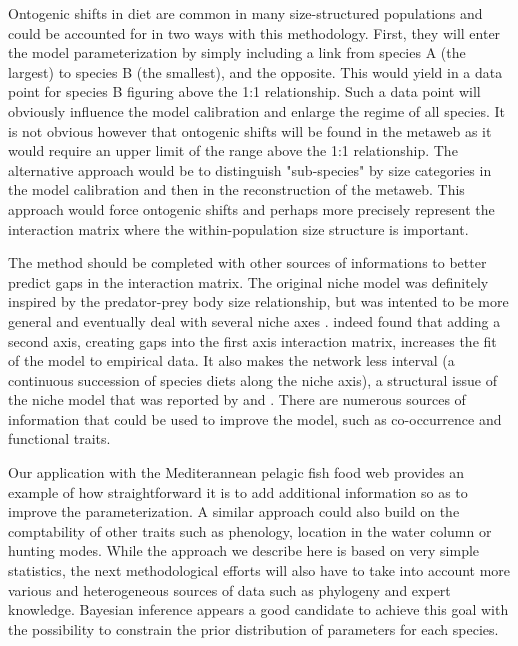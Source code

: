 \documentclass[12pt]{article}
\begin{document}
Ontogenic shifts in diet are common in many size-structured populations and could be accounted for in two ways with this methodology. First, they will enter the model parameterization by simply including a link from species A (the largest) to species B (the smallest), and the opposite. This would yield in a data point for species B figuring above the 1:1 relationship. Such a data point will obviously influence the model calibration and enlarge the regime of all species. It is not obvious however that ontogenic shifts will be found in the metaweb as it would require an upper limit of the range above the 1:1 relationship. The alternative approach would be to distinguish "sub-species" by size categories in the model calibration and then in the reconstruction of the metaweb. This approach would force ontogenic shifts and perhaps more precisely represent the interaction matrix where the within-population size structure is important. 

The method should be completed with other sources of informations to better predict gaps in the interaction matrix. The original niche model was definitely inspired by the predator-prey body size relationship, but was intented to be more general and eventually deal with several niche axes \parencite{Williams2000}. \textcite{Allesina2008} indeed found that adding a second axis, creating gaps into the first axis interaction matrix, increases the fit of the model to empirical data. It also makes the network less interval (a continuous succession of species diets along the niche axis), a structural issue of the niche model that was reported by \textcite{Cattin2004} and \textcite{Bersier2006}. There are numerous sources of information that could be used to improve the model, such as co-occurrence and functional traits. 

Our application with the Mediterannean pelagic fish food web provides an example of how straightforward it is to add additional information so as to improve the parameterization. A similar approach could also build on the comptability of other traits such as phenology, location in the water column or hunting modes. While the approach we describe here is based on very simple statistics, the next methodological efforts will also have to take into account more various and heterogeneous sources of data such as phylogeny \parencite{Eklof2012} and expert knowledge. Bayesian inference appears a good candidate to achieve this goal with the possibility to constrain the prior distribution of parameters for each species. 
\end{document}
